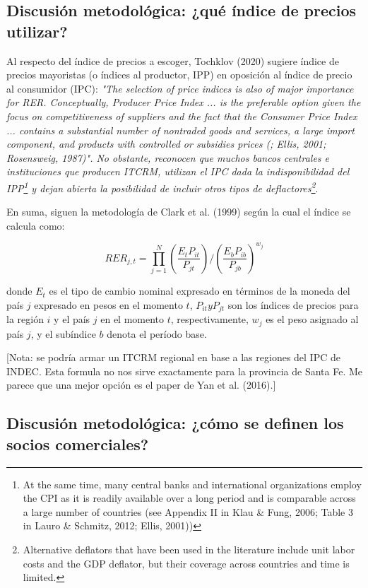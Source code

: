 \subsection{Discusión metodológica: ¿qué índice de precios utilizar?}

Al respecto del índice de precios a escoger, Tochklov (2020) sugiere índice de precios mayoristas (o índices al productor, IPP) en oposición al índice de precio al consumidor (IPC): \textit{"The selection of price indices is also of major importance for RER. Conceptually, Producer Price Index ... is the preferable option given the focus on competitiveness of suppliers and the fact that the Consumer Price Index ... contains a substantial number of nontraded goods and services, a large import component, and products with controlled or subsidies prices (\cite{clark1999}; Ellis, 2001; Rosensweig, 1987)". No obstante, reconocen que muchos bancos centrales e instituciones que producen ITCRM, utilizan el IPC dada la indisponibilidad del IPP\footnote{At the same time, many central banks and international organizations employ the CPI as it is readily available over a long period and is comparable across a large number of countries (see Appendix II in Klau \& Fung, 2006; Table 3 in Lauro \& Schmitz, 2012; Ellis, 2001))} y dejan abierta la posibilidad de incluir otros tipos de deflactores\footnote{Alternative deflators that have been used in the literature include unit labor costs and the GDP deflator, but their coverage across countries and time is limited.}}.

En suma, siguen la metodología de Clark et al. (1999) según la cual el índice se calcula como:

\[
RER_{j,t} = \prod_{j=1}^{N} \left( \frac{E_{t}P_{it}}{P_{jt}} \right) / \left(  \frac{E_{b}P_{ib}}{P_{jb}} \right)^{w_j}
\]

donde $E_{t}$ es el tipo de cambio nominal expresado en términos de la moneda del país $j$ expresado en pesos en el momento $t$, $P_{it} y P_{jt}$ son los índices de precios para la región $i$ y el país $j$ en el momento $t$, respectivamente, $w_j$ es el peso asignado al país $j$, y el subíndice $b$ denota el período base.

[Nota: se podría armar un ITCRM regional en base a las regiones del IPC de INDEC. Esta formula no nos sirve exactamente para la provincia de Santa Fe. Me parece que una mejor opción es el paper de Yan et al. (2016).]

\subsection{Discusión metodológica: ¿cómo se definen los socios comerciales?}

